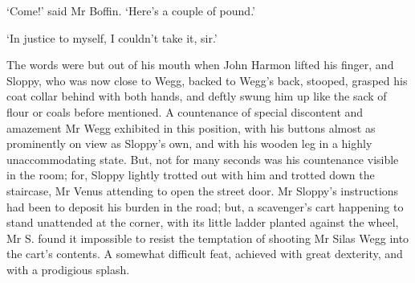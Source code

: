 ‘Come!’ said Mr Boffin. ‘Here’s a couple of pound.’

‘In justice to myself, I couldn’t take it, sir.’

The words were but out of his mouth when John Harmon lifted his finger,
and Sloppy, who was now close to Wegg, backed to Wegg’s back, stooped,
grasped his coat collar behind with both hands, and deftly swung him
up like the sack of flour or coals before mentioned. A countenance of
special discontent and amazement Mr Wegg exhibited in this position,
with his buttons almost as prominently on view as Sloppy’s own, and
with his wooden leg in a highly unaccommodating state. But, not for many
seconds was his countenance visible in the room; for, Sloppy lightly
trotted out with him and trotted down the staircase, Mr Venus attending
to open the street door. Mr Sloppy’s instructions had been to deposit
his burden in the road; but, a scavenger’s cart happening to stand
unattended at the corner, with its little ladder planted against the
wheel, Mr S. found it impossible to resist the temptation of shooting Mr
Silas Wegg into the cart’s contents. A somewhat difficult feat, achieved
with great dexterity, and with a prodigious splash.



